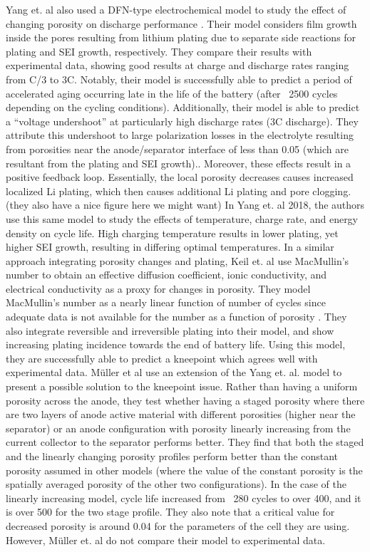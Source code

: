 \documentclass{article}
\begin{document}
Yang et. al also used a DFN-type electrochemical model to study the effect of changing porosity on discharge performance \cite{yang_modeling_2017}. Their model considers film growth inside the pores resulting from lithium plating due to separate side reactions for plating and SEI growth, respectively. They compare their results with experimental data, showing good results at charge and discharge rates ranging from C/3 to 3C. Notably, their model is successfully able to predict a period of accelerated aging occurring late in the life of the battery (after ~2500 cycles depending on the cycling conditions). Additionally, their model is able to predict a “voltage undershoot” at particularly high discharge rates (3C discharge). They attribute this undershoot to large polarization losses in the electrolyte resulting from porosities near the anode/separator interface of less than 0.05 (which are resultant from the plating and SEI growth).\cite{yang_modeling_2017}. Moreover, these effects result in a positive feedback loop. Essentially, the local porosity decreases causes increased localized Li plating, which then causes additional Li plating and pore clogging. (they also have a nice figure here we might want) In Yang et. al 2018, the authors use this same model to study the effects of temperature, charge rate, and energy density on cycle life. High charging temperature results in lower plating, yet higher SEI growth, resulting in differing optimal temperatures. In a similar approach integrating porosity changes and plating, Keil et. al use MacMullin’s number to obtain an effective diffusion coefficient, ionic conductivity, and electrical conductivity as a proxy for changes in porosity. They model MacMullin’s number as a nearly linear function of number of cycles since adequate data is not available for the number as a function of porosity \cite{keil_electrochemical_2020}. They also integrate reversible and irreversible plating into their model, and show increasing plating incidence towards the end of battery life\cite{keil_electrochemical_2020}. Using this model, they are successfully able to predict a kneepoint which agrees well with experimental data\cite{keil_electrochemical_2020}. 
Müller et al use an extension of the Yang et. al. model to present a possible solution to the kneepoint issue. Rather than having a uniform porosity across the anode, they test whether having a staged porosity where there are two layers of anode active material with different porosities (higher near the separator) or an anode configuration with porosity linearly increasing from the current collector to the separator performs better. They find that both the staged and the linearly changing porosity profiles perform better than the constant porosity assumed in other models (where the value of the constant porosity is the spatially averaged porosity of the other two configurations). In the case of the linearly increasing model, cycle life increased from ~280 cycles to over 400, and it is over 500 for the two stage profile. They also note that a critical value for decreased porosity is around 0.04 for the parameters of the cell they are using. However, Müller et. al do not compare their model to experimental data. 
\end{document}
